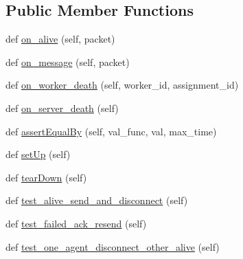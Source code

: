 \subsection*{Public Member Functions}
\begin{DoxyCompactItemize}
\item 
def \hyperlink{classparlai_1_1mturk_1_1core_1_1test_1_1test__socket__manager_1_1TestSocketManagerMessageHandling_a9ad060b79b7082628866c58b4cc35dbd}{on\+\_\+alive} (self, packet)
\item 
def \hyperlink{classparlai_1_1mturk_1_1core_1_1test_1_1test__socket__manager_1_1TestSocketManagerMessageHandling_a6e4f61f7261bb85211573bbad8a60358}{on\+\_\+message} (self, packet)
\item 
def \hyperlink{classparlai_1_1mturk_1_1core_1_1test_1_1test__socket__manager_1_1TestSocketManagerMessageHandling_a2da54e616288902d58dc23b90d2104a1}{on\+\_\+worker\+\_\+death} (self, worker\+\_\+id, assignment\+\_\+id)
\item 
def \hyperlink{classparlai_1_1mturk_1_1core_1_1test_1_1test__socket__manager_1_1TestSocketManagerMessageHandling_a6550815e562fabf489e4aacf809d8650}{on\+\_\+server\+\_\+death} (self)
\item 
def \hyperlink{classparlai_1_1mturk_1_1core_1_1test_1_1test__socket__manager_1_1TestSocketManagerMessageHandling_a7ea4f48c627182930545cb830a7c99be}{assert\+Equal\+By} (self, val\+\_\+func, val, max\+\_\+time)
\item 
def \hyperlink{classparlai_1_1mturk_1_1core_1_1test_1_1test__socket__manager_1_1TestSocketManagerMessageHandling_a43d30dc3d5efa47b370e09a228cff7cf}{set\+Up} (self)
\item 
def \hyperlink{classparlai_1_1mturk_1_1core_1_1test_1_1test__socket__manager_1_1TestSocketManagerMessageHandling_ac55d47400950c3c6dda879fe4548fe4f}{tear\+Down} (self)
\item 
def \hyperlink{classparlai_1_1mturk_1_1core_1_1test_1_1test__socket__manager_1_1TestSocketManagerMessageHandling_a3730eb52099b98516a51430cb96d326b}{test\+\_\+alive\+\_\+send\+\_\+and\+\_\+disconnect} (self)
\item 
def \hyperlink{classparlai_1_1mturk_1_1core_1_1test_1_1test__socket__manager_1_1TestSocketManagerMessageHandling_a7d601bf13b32544669ce064e7e6f4cbb}{test\+\_\+failed\+\_\+ack\+\_\+resend} (self)
\item 
def \hyperlink{classparlai_1_1mturk_1_1core_1_1test_1_1test__socket__manager_1_1TestSocketManagerMessageHandling_a8cf0c53c1d5a85e2305decbec92b323b}{test\+\_\+one\+\_\+agent\+\_\+disconnect\+\_\+other\+\_\+alive} (self)
\end{DoxyCompactItemize}
